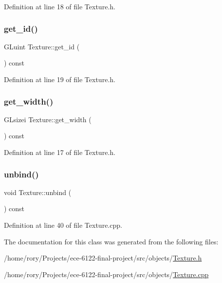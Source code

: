 Definition at line 18 of file Texture.\+h.

\mbox{\label{class_texture_a53aa350bde0fc93271c74e2bd2b391fa}} 
\subsubsection{\texorpdfstring{get\+\_\+id()}{get\_id()}}
{\footnotesize\ttfamily G\+Luint Texture\+::get\+\_\+id (\begin{DoxyParamCaption}{ }\end{DoxyParamCaption}) const\hspace{0.3cm}{\ttfamily [inline]}}



Definition at line 19 of file Texture.\+h.

\mbox{\label{class_texture_a29224e09dad7892ec84ea379703b512c}} 
\subsubsection{\texorpdfstring{get\+\_\+width()}{get\_width()}}
{\footnotesize\ttfamily G\+Lsizei Texture\+::get\+\_\+width (\begin{DoxyParamCaption}{ }\end{DoxyParamCaption}) const\hspace{0.3cm}{\ttfamily [inline]}}



Definition at line 17 of file Texture.\+h.

\mbox{\label{class_texture_a451d7afac3848417bb1007d39ee7d545}} 
\subsubsection{\texorpdfstring{unbind()}{unbind()}}
{\footnotesize\ttfamily void Texture\+::unbind (\begin{DoxyParamCaption}{ }\end{DoxyParamCaption}) const}



Definition at line 40 of file Texture.\+cpp.



The documentation for this class was generated from the following files\+:\begin{DoxyCompactItemize}
\item 
/home/rory/\+Projects/ece-\/6122-\/final-\/project/src/objects/\hyperlink{_texture_8h}{Texture.\+h}\item 
/home/rory/\+Projects/ece-\/6122-\/final-\/project/src/objects/\hyperlink{_texture_8cpp}{Texture.\+cpp}\end{DoxyCompactItemize}
